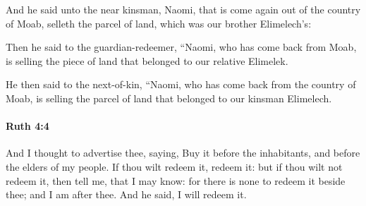 			\begin{versebox}
					\item[BHS] 
					\item[LXX] 
					\item[ASV] And he said unto the near kinsman, Naomi, that is come again out of the country of Moab, selleth the parcel of land, which was our brother Elimelech's:
					\item[NIV] Then he said to the guardian-redeemer, “Naomi, who has come back from Moab, is selling the piece of land that belonged to our relative Elimelek.
					\item[NRSV] He then said to the next-of-kin, “Naomi, who has come back from the country of Moab, is selling the parcel of land that belonged to our kinsman Elimelech.
			\end{versebox}

		\paragraph{Ruth 4:4} %
			\label{RUTH-4-4}

			And I thought to advertise thee, saying, Buy it before the inhabitants, and before the elders of my people. If thou wilt redeem it, redeem it: but if thou wilt not redeem it, then tell me, that I may know: for there is none to redeem it beside thee; and I am after thee. And he said, I will redeem it.


